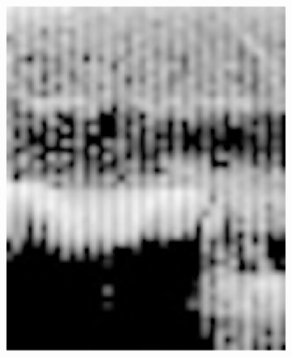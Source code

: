 \begin{figure}[h!]
	\centering
	
	\begin{subfigure}{0.45\textwidth}
		\includegraphics[width=\linewidth]{Images/DataMining/SpectrogramYes.jpg}
		\caption{}    %
		\label{subfig:SpectralYes}
	\end{subfigure}
	\hfill
	\begin{subfigure}{0.45\textwidth}

\end{subfigure}
\end{figure}
